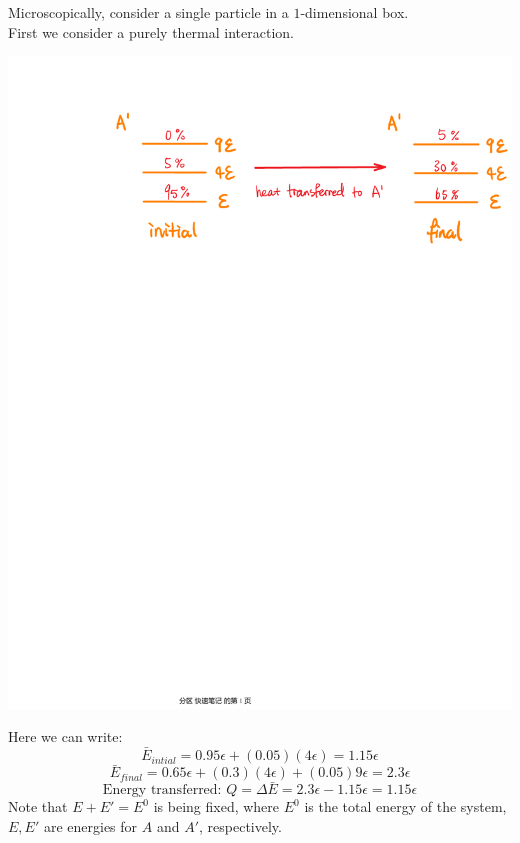 \documentclass[11pt,oneside]{book}
\theoremstyle{break}
\theoremstyle{break}
\begin{document}
Microscopically, consider a single particle in a $1$-dimensional box.\\
First we consider a purely thermal interaction. 
\begin{center}
\includegraphics[scale=0.5]{thermalInteraction.pdf}
\end{center}
Here we can write:
$$\bar{E}_{intial} = 0.95 \epsilon + (0.05)(4\epsilon) = 1.15\epsilon$$
$$\bar{E}_{final} = 0.65 \epsilon + (0.3) (4\epsilon) + (0.05)9\epsilon = 2.3\epsilon$$
$$\text{Energy transferred: } Q = \Delta \bar{E} = 2.3\epsilon - 1.15\epsilon = 1.15\epsilon$$
Note that $E + E' = E^0$ is being fixed, where $E^0$ is the total energy of the system, $E,E'$ are energies for $A$ and $A'$, respectively. \\
\end{document}

